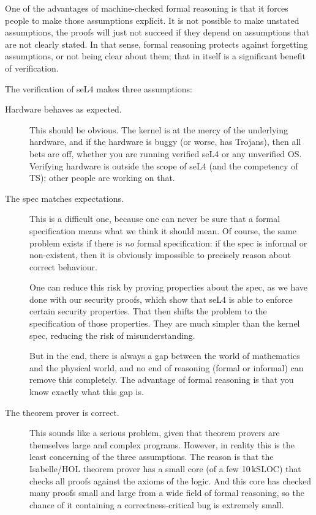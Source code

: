 \documentclass[english,a4paper,12pt]{report}
\begin{document}
  One of the advantages of machine-checked formal reasoning is that it
  forces people to make those assumptions explicit. It is not possible
  to make unstated assumptions, the proofs will just not succeed if
  they depend on assumptions that are not clearly stated. In that
  sense, formal reasoning protects against forgetting assumptions, or
  not being clear about them; that in itself is a significant benefit
  of verification.

  The verification of seL4 makes three assumptions:
  \begin{description}
  \item[Hardware behaves as expected.] This should be obvious. The
    kernel is at the mercy of the underlying hardware, and if the
    hardware is buggy (or worse, has Trojans), then all bets are off,
    whether you are running verified seL4 or any unverified
    OS. Verifying hardware is outside the scope of seL4 (and
    the competency of TS); other people are working on that.
  \item[The spec matches expectations.] This is a difficult one,
    because one can never be sure that a formal specification means
    what we think it should mean. Of course, the same problem exists
    if there is \emph{no} formal specification: if the spec is informal or
    non-existent, then it is obviously impossible to precisely reason
    about correct behaviour.

    One can reduce this risk by proving properties about the spec, as
    we have done with our security proofs, which show that seL4 is
    able to enforce certain security properties. That then shifts the
    problem to the specification of those properties. They are much
    simpler than the kernel spec, reducing the risk of misunderstanding.

    But in the end, there is always a gap between the world of mathematics  and
    the physical world, and no end of reasoning (formal or informal)
    can remove this completely. The advantage of formal reasoning is
    that you know exactly what this gap is.
  \item[The theorem prover is correct.] This sounds like a serious
    problem, given that theorem provers are themselves large and
    complex programs. However, in reality this is the least concerning
    of the three assumptions. The reason is that the Isabelle/HOL
    theorem prover has a small core (of a few 10\,kSLOC) that checks
    all proofs against the axioms of the logic. And this core has
    checked many proofs small and large from a wide field of formal
    reasoning, so the chance of it containing a correctness-critical
    bug is extremely small.
  \end{description}
\end{document}
